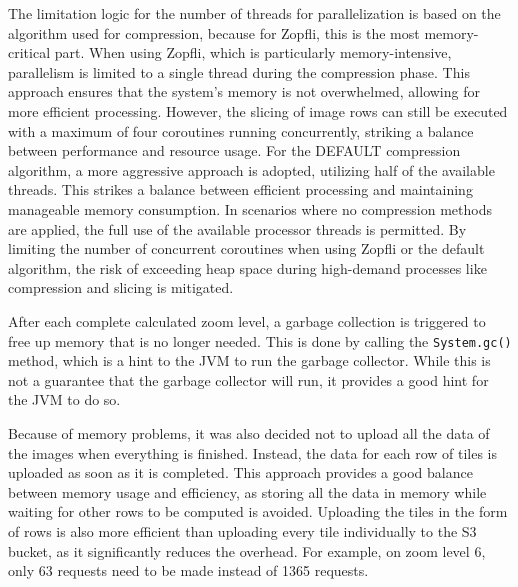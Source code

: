 The limitation logic for the number of threads for parallelization is based on the algorithm used for compression, because for Zopfli, this is the most memory-critical part. When using Zopfli, which is particularly memory-intensive, parallelism is limited to a single thread during the compression phase. This approach ensures that the system's memory is not overwhelmed, allowing for more efficient processing. However, the slicing of image rows can still be executed with a maximum of four coroutines running concurrently, striking a balance between performance and resource usage. For the DEFAULT compression algorithm, a more aggressive approach is adopted, utilizing half of the available threads. This strikes a balance between efficient processing and maintaining manageable memory consumption. In scenarios where no compression methods are applied, the full use of the available processor threads is permitted. By limiting the number of concurrent coroutines when using Zopfli or the default algorithm, the risk of exceeding heap space during high-demand processes like compression and slicing is mitigated.

After each complete calculated zoom level, a garbage collection is triggered to free up memory that is no longer needed. This is done by calling the \texttt{System.gc()} method, which is a hint to the JVM to run the garbage collector. While this is not a guarantee that the garbage collector will run, it provides a good hint for the JVM to do so.

Because of memory problems, it was also decided not to upload all the data of the images when everything is finished. Instead, the data for each row of tiles is uploaded as soon as it is completed. This approach provides a good balance between memory usage and efficiency, as storing all the data in memory while waiting for other rows to be computed is avoided. Uploading the tiles in the form of rows is also more efficient than uploading every tile individually to the S3 bucket, as it significantly reduces the overhead. For example, on zoom level 6, only 63 requests need to be made instead of 1365 requests.